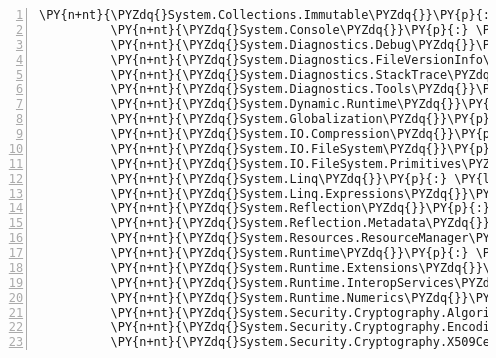 \begin{Verbatim}[commandchars=\\\{\},numbers=left,firstnumber=1,stepnumber=1,numberblanklines=0]
          \PY{n+nt}{\PYZdq{}System.Collections.Immutable\PYZdq{}}\PY{p}{:} \PY{l+s+s2}{\PYZdq{}1.5.0\PYZhy{}rc1\PYZdq{}}\PY{p}{,}
          \PY{n+nt}{\PYZdq{}System.Console\PYZdq{}}\PY{p}{:} \PY{l+s+s2}{\PYZdq{}4.3.0\PYZdq{}}\PY{p}{,}
          \PY{n+nt}{\PYZdq{}System.Diagnostics.Debug\PYZdq{}}\PY{p}{:} \PY{l+s+s2}{\PYZdq{}4.3.0\PYZdq{}}\PY{p}{,}
          \PY{n+nt}{\PYZdq{}System.Diagnostics.FileVersionInfo\PYZdq{}}\PY{p}{:} \PY{l+s+s2}{\PYZdq{}4.3.0\PYZdq{}}\PY{p}{,}
          \PY{n+nt}{\PYZdq{}System.Diagnostics.StackTrace\PYZdq{}}\PY{p}{:} \PY{l+s+s2}{\PYZdq{}4.3.0\PYZdq{}}\PY{p}{,}
          \PY{n+nt}{\PYZdq{}System.Diagnostics.Tools\PYZdq{}}\PY{p}{:} \PY{l+s+s2}{\PYZdq{}4.3.0\PYZdq{}}\PY{p}{,}
          \PY{n+nt}{\PYZdq{}System.Dynamic.Runtime\PYZdq{}}\PY{p}{:} \PY{l+s+s2}{\PYZdq{}4.3.0\PYZdq{}}\PY{p}{,}
          \PY{n+nt}{\PYZdq{}System.Globalization\PYZdq{}}\PY{p}{:} \PY{l+s+s2}{\PYZdq{}4.3.0\PYZdq{}}\PY{p}{,}
          \PY{n+nt}{\PYZdq{}System.IO.Compression\PYZdq{}}\PY{p}{:} \PY{l+s+s2}{\PYZdq{}4.3.0\PYZdq{}}\PY{p}{,}
          \PY{n+nt}{\PYZdq{}System.IO.FileSystem\PYZdq{}}\PY{p}{:} \PY{l+s+s2}{\PYZdq{}4.3.0\PYZdq{}}\PY{p}{,}
          \PY{n+nt}{\PYZdq{}System.IO.FileSystem.Primitives\PYZdq{}}\PY{p}{:} \PY{l+s+s2}{\PYZdq{}4.3.0\PYZdq{}}\PY{p}{,}
          \PY{n+nt}{\PYZdq{}System.Linq\PYZdq{}}\PY{p}{:} \PY{l+s+s2}{\PYZdq{}4.3.0\PYZdq{}}\PY{p}{,}
          \PY{n+nt}{\PYZdq{}System.Linq.Expressions\PYZdq{}}\PY{p}{:} \PY{l+s+s2}{\PYZdq{}4.3.0\PYZdq{}}\PY{p}{,}
          \PY{n+nt}{\PYZdq{}System.Reflection\PYZdq{}}\PY{p}{:} \PY{l+s+s2}{\PYZdq{}4.3.0\PYZdq{}}\PY{p}{,}
          \PY{n+nt}{\PYZdq{}System.Reflection.Metadata\PYZdq{}}\PY{p}{:} \PY{l+s+s2}{\PYZdq{}1.6.0\PYZhy{}rc1\PYZdq{}}\PY{p}{,}
          \PY{n+nt}{\PYZdq{}System.Resources.ResourceManager\PYZdq{}}\PY{p}{:} \PY{l+s+s2}{\PYZdq{}4.3.0\PYZdq{}}\PY{p}{,}
          \PY{n+nt}{\PYZdq{}System.Runtime\PYZdq{}}\PY{p}{:} \PY{l+s+s2}{\PYZdq{}4.3.0\PYZdq{}}\PY{p}{,}
          \PY{n+nt}{\PYZdq{}System.Runtime.Extensions\PYZdq{}}\PY{p}{:} \PY{l+s+s2}{\PYZdq{}4.3.0\PYZdq{}}\PY{p}{,}
          \PY{n+nt}{\PYZdq{}System.Runtime.InteropServices\PYZdq{}}\PY{p}{:} \PY{l+s+s2}{\PYZdq{}4.3.0\PYZdq{}}\PY{p}{,}
          \PY{n+nt}{\PYZdq{}System.Runtime.Numerics\PYZdq{}}\PY{p}{:} \PY{l+s+s2}{\PYZdq{}4.3.0\PYZdq{}}\PY{p}{,}
          \PY{n+nt}{\PYZdq{}System.Security.Cryptography.Algorithms\PYZdq{}}\PY{p}{:} \PY{l+s+s2}{\PYZdq{}4.3.0\PYZdq{}}\PY{p}{,}
          \PY{n+nt}{\PYZdq{}System.Security.Cryptography.Encoding\PYZdq{}}\PY{p}{:} \PY{l+s+s2}{\PYZdq{}4.3.0\PYZdq{}}\PY{p}{,}
          \PY{n+nt}{\PYZdq{}System.Security.Cryptography.X509Certificates\PYZdq{}}\PY{p}{:} \PY{l+s+s2}{\PYZdq{}4.3.0\PYZdq{}}\PY{p}{,}

\end{Verbatim}
